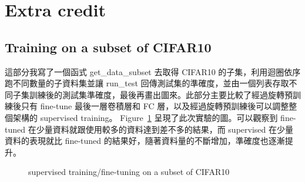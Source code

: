 \documentclass[a4paper,12pt]{article}   %
\begin{document}
\section{Extra credit}

\subsection{Training on a subset of CIFAR10}
	這部分我寫了一個函式 get\_data\_subset 去取得 CIFAR10 的子集，利用迴圈依序跑不同數量的子資料集並讓 run\_test 回傳測試集的準確度，並由一個列表存取不同子集訓練後的測試集準確度，最後再畫出圖來。此部分主要比較了經過旋轉預訓練後只有 fine-tune 最後一層卷積層和 FC 層，以及經過旋轉預訓練後可以調整整個架構的 supervised training。 Figure\ \ref{fig:comparison} 呈現了此次實驗的圖。可以觀察到 fine-tuned 在少量資料就跟使用較多的資料達到差不多的結果，而 supervised 在少量資料的表現就比 fine-tuned 的結果好，隨著資料量的不斷增加，準確度也逐漸提升。
	
\begin{figure}[htb]
  \vspace{0.1\baselineskip}  
  \centering  
    \caption{supervised training/fine-tuning on a subset of CIFAR10}
    \label{fig:comparison}
  \vspace{0.1\baselineskip}
\end{figure}
\end{document}

